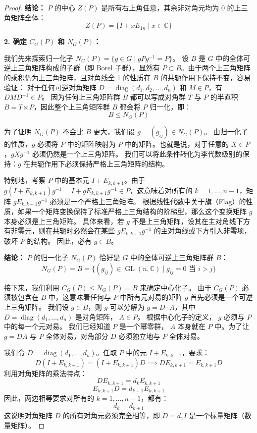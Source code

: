 \documentclass[]{article}
\begin{document}
\begin{proof}
\noindent \textbf{结论：} $P$ 的中心 $Z(P)$ 是所有右上角任意，其余非对角元均为 0 的上三角矩阵全体：
\[ Z(P) = \{ I + xE_{1n} \mid x \in \mathbb{C} \} \]

\bigskip
\noindent \textbf{2. 确定 $C_G(P)$ 和 $N_G(P)$：}

我们先来探索归一化子 $N_G(P) = \{ g \in G \mid gPg^{-1} = P \}$。
设 $B$ 是 $G$ 中的全体可逆上三角矩阵构成的子群（即 Borel 子群），显然有 $P \subset B$。由于两个上三角矩阵的乘积仍为上三角矩阵，且对角线全 1 的性质在 $B$ 的共轭作用下保持不变，容易验证：
对于任何可逆对角矩阵 $D = \operatorname{diag}(d_1, d_2, \dots, d_n)$ 和 $M \in P$，有 $DMD^{-1} \in P$。
因为任何上三角矩阵群 $B$ 都可以写成对角群 $T$ 与 $P$ 的半直积 $B = T \ltimes P$，因此整个上三角矩阵群 $B$ 都会将 $P$ 归一化，即：
\[ B \leqslant N_G(P) \]

为了证明 $N_G(P)$ 不会比 $B$ 更大，我们设 $g = (g_{ij}) \in N_G(P)$。
由归一化子的性质，$g$ 必须将 $P$ 中的矩阵映射为 $P$ 中的矩阵。也就是说，对于任意的 $X \in P$，$gXg^{-1}$ 必须仍然是一个上三角矩阵。
我们可以将此条件转化为李代数级别的保持：$g$ 在共轭作用下必须保持严格上三角矩阵的结构。

特别地，考察 $P$ 中的基本元 $I + E_{k,k+1}$。由于 $g(I + E_{k,k+1})g^{-1} = I + gE_{k,k+1}g^{-1} \in P$，这意味着对所有的 $k = 1, \dots, n-1$，矩阵 $gE_{k,k+1}g^{-1}$ 必须是一个严格上三角矩阵。
根据线性代数中关于旗（Flag）的性质，如果一个矩阵变换保持了标准严格上三角结构的阶梯型，那么这个变换矩阵 $g$ 本身必须是上三角矩阵。
具体来看，若 $g$ 不是上三角矩阵，设其在主对角线下方有非零元，则在共轭时必然会在某些 $gE_{k,k+1}g^{-1}$ 的主对角线或下方引入非零项，破坏 $P$ 的结构。
因此，必有 $g \in B$。

\noindent \textbf{结论：} $P$ 的归一化子 $N_G(P)$ 恰好是 $G$ 中的全体可逆上三角矩阵群 $B$：
\[ N_G(P) = B = \{ (g_{ij}) \in \operatorname{GL}(n, \mathbb{C}) \mid g_{ij} = 0 \text{ 当 } i > j \} \]

接下来，我们利用 $C_G(P) \leqslant N_G(P) = B$ 来确定中心化子。
由于 $C_G(P)$ 必须被包含在 $B$ 中，这意味着任何与 $P$ 中所有元对易的矩阵 $g$ 首先必须是一个可逆上三角矩阵。
我们设 $g \in B$，则 $g$ 可以分解为 $g = D \cdot A$，其中 $D = \operatorname{diag}(d_1, \dots, d_n)$ 是对角矩阵， $A \in P$。
根据中心化子的定义， $g$ 必须与 $P$ 中的每一个元对易。
我们已经知道 $P$ 是一个幂零群， $A$ 本身就在 $P$ 中。为了让 $g = DA$ 与 $P$ 全体对易，对角部分 $D$ 必须独立地与 $P$ 全体对易。

我们令 $D = \operatorname{diag}(d_1, \dots, d_n)$。任取 $P$ 中的元 $I + E_{k,k+1}$，要求：
\[ D(I + E_{k,k+1}) = (I + E_{k,k+1})D \implies DE_{k,k+1} = E_{k,k+1}D \]
利用对角矩阵的乘法特点：
\[ DE_{k,k+1} = d_k E_{k,k+1} \]
\[ E_{k,k+1}D = d_{k+1} E_{k,k+1} \]
因此，两边相等要求对所有的 $k = 1, \dots, n-1$，都有：
\[ d_k = d_{k+1} \]
这说明对角矩阵 $D$ 的所有对角元必须完全相等，即 $D = d_1 I$ 是一个标量矩阵（数量矩阵）。


\end{proof}
\end{document}
